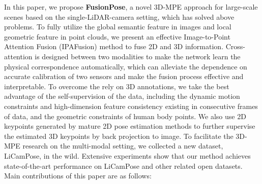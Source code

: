 \documentclass[letterpaper]{article} %
\begin{document}
In this paper, we propose \textbf{FusionPose}, a novel 3D-MPE approach for large-scale scenes based on the single-LiDAR-camera setting, which has solved above problems. To fully utilize the global semantic feature in images and local geometric feature in point clouds, we present an effective Image-to-Point Attention Fusion (IPAFusion) method to fuse 2D and 3D information. Cross-attention is designed between two modalities to make the network learn the physical correspondence automatically, which can alleviate the dependence on accurate calibration of two sensors and make the fusion process effective and interpretable. To overcome the rely on 3D annotations, we take the best advantage of the self-supervision of the data, including the dynamic motion constraints and high-dimension feature consistency existing in consecutive frames of data, and the geometric constraints of human body points. We also use 2D keypoints generated by mature 2D pose estimation methods to further supervise the estimated 3D keypoints by back projection to image. To facilitate the 3D-MPE research on the multi-modal setting, we collected a new dataset, LiCamPose, in the wild. Extensive experiments show that our method achieves state-of-the-art performance on LiCamPose and other related open datasets. Main contributions of this paper are as follows:
\end{document}
